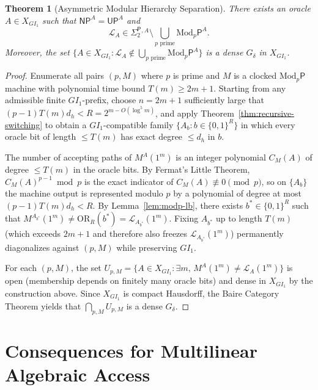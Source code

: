 \documentclass[11pt,a4paper]{article}
\newtheorem{theorem}{Theorem}[section]
\theoremstyle{definition}
\theoremstyle{remark}
\newcommand{\NP}{\mathsf{NP}}
\newcommand{\UP}{\mathsf{UP}}
\newcommand{\Modp}{\mathrm{Mod}_p\mathsf{P}}
\newcommand{\SigTwo}{\Sigma_2^{\mathsf{P}}}
\newcommand{\OR}{\mathrm{OR}}
\newcommand{\GI}{GI_1}
\begin{document}
\begin{theorem}[Asymmetric Modular Hierarchy Separation]
\label{thm:main-sep}
There exists an oracle $A \in X_{\GI}$ such that $\NP^A = \UP^A$ and
\[
  \mathcal{L}_A \in \SigTwo{}^{,A} \setminus \bigcup_{p\text{ prime}} \Modp^A.
\]
Moreover, the set $\{A \in X_{\GI} : \mathcal{L}_A \notin \bigcup_{p\text{ prime}} \Modp^A\}$ is a dense $G_\delta$ in $X_{\GI}$.
\end{theorem}

\begin{proof}
Enumerate all pairs $(p, M)$ where $p$ is prime and $M$ is a clocked $\Modp$ machine with polynomial time bound $T(m) \ge 2m + 1$. Starting from any admissible finite $\GI$-prefix, choose $n = 2m+1$ sufficiently large that $(p-1) T(m) d_h < R = 2^{m - O(\log^5 m)}$, and apply Theorem~\ref{thm:recursive-switching} to obtain a $\GI$-compatible family $\{A_b : b \in \{0,1\}^R\}$ in which every oracle bit of length $\le T(m)$ has exact degree $\le d_h$ in $b$.

The number of accepting paths of $M^A(1^m)$ is an integer polynomial $C_M(A)$ of degree $\le T(m)$ in the oracle bits. By Fermat's Little Theorem, $C_M(A)^{p-1} \bmod p$ is the exact indicator of $C_M(A) \not\equiv 0 \pmod p$, so on $\{A_b\}$ the machine output is represented modulo $p$ by a polynomial of degree at most $(p-1)T(m)d_h < R$. By Lemma~\ref{lem:modp-lb}, there exists $b^* \in \{0,1\}^R$ such that $M^{A_{b^*}}(1^m) \ne \OR_R(b^*) = \mathcal{L}_{A_{b^*}}(1^m)$. Fixing $A_{b^*}$ up to length $T(m)$ (which exceeds $2m+1$ and therefore also freezes $\mathcal{L}_{A_{b^*}}(1^m)$) permanently diagonalizes against $(p, M)$ while preserving $\GI$.

For each $(p, M)$, the set $U_{p,M} = \{A \in X_{\GI} : \exists m,\, M^A(1^m) \ne \mathcal{L}_A(1^m)\}$ is open (membership depends on finitely many oracle bits) and dense in $X_{\GI}$ by the construction above. Since $X_{\GI}$ is compact Hausdorff, the Baire Category Theorem yields that $\bigcap_{p,M} U_{p,M}$ is a dense $G_\delta$.
\end{proof}

\section{Consequences for Multilinear Algebraic Access}
\end{document}
